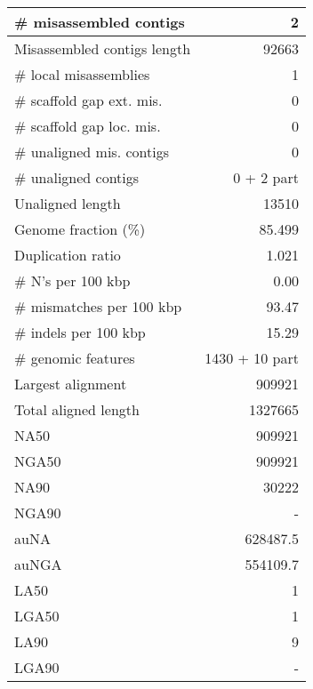 \documentclass[12pt,a4paper]{article}
\begin{document}
\begin{table}[ht]
\begin{center}
\begin{tabular}{|l*{1}{|r}|}
\# misassembled contigs & 2 \\ \hline
Misassembled contigs length & 92663 \\ \hline
\# local misassemblies & 1 \\ \hline
\# scaffold gap ext. mis. & 0 \\ \hline
\# scaffold gap loc. mis. & 0 \\ \hline
\# unaligned mis. contigs & 0 \\ \hline
\# unaligned contigs & 0 + 2 part \\ \hline
Unaligned length & 13510 \\ \hline
Genome fraction (\%) & 85.499 \\ \hline
Duplication ratio & 1.021 \\ \hline
\# N's per 100 kbp & 0.00 \\ \hline
\# mismatches per 100 kbp & 93.47 \\ \hline
\# indels per 100 kbp & 15.29 \\ \hline
\# genomic features & 1430 + 10 part \\ \hline
Largest alignment & 909921 \\ \hline
Total aligned length & 1327665 \\ \hline
NA50 & 909921 \\ \hline
NGA50 & 909921 \\ \hline
NA90 & 30222 \\ \hline
NGA90 & - \\ \hline
auNA & 628487.5 \\ \hline
auNGA & 554109.7 \\ \hline
LA50 & 1 \\ \hline
LGA50 & 1 \\ \hline
LA90 & 9 \\ \hline
LGA90 & - \\ \hline
\end{tabular}
\end{center}
\end{table}
\end{document}
